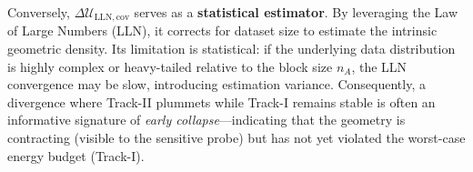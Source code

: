 \documentclass{article}
\theoremstyle{plain}
\theoremstyle{definition}
\theoremstyle{remark}
\newcommand{\sgma}{\textsc{Sigma}\xspace}
\begin{document}
Conversely, $\Delta\mathcal{U}_{\mathrm{LLN,cov}}$ serves as a \textbf{statistical estimator}. By leveraging the Law of Large Numbers (LLN), it corrects for dataset size to estimate the intrinsic geometric density. Its limitation is statistical: if the underlying data distribution is highly complex or heavy-tailed relative to the block size $n_A$, the LLN convergence may be slow, introducing estimation variance. Consequently, a divergence where Track-II plummets while Track-I remains stable is often an informative signature of \textit{early collapse}—indicating that the geometry is contracting (visible to the sensitive probe) but has not yet violated the worst-case energy budget (Track-I).







\end{document}
